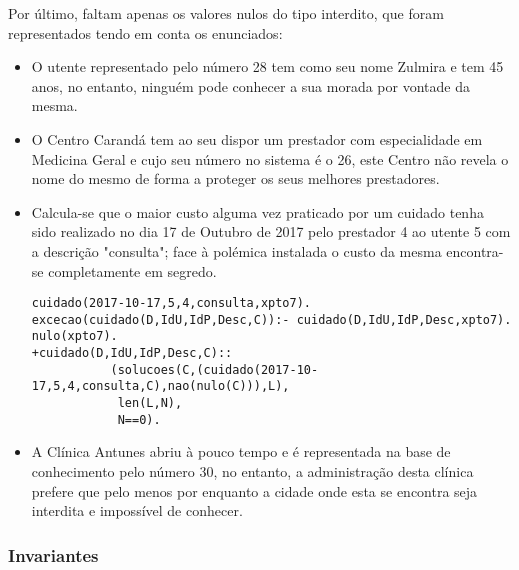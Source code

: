 \documentclass{article}
\begin{document}
Por último, faltam apenas os valores nulos do tipo interdito, que foram representados tendo em conta os enunciados:
\begin{itemize}
	\item O utente representado pelo número 28 tem como seu nome Zulmira e tem 45 anos, no entanto, ninguém pode conhecer a sua morada por vontade da mesma.
	\item O Centro Carandá tem ao seu dispor um prestador com especialidade em Medicina Geral e cujo seu número no sistema é o 26, este Centro não revela o nome do mesmo de forma a proteger os seus melhores prestadores.
    \item Calcula-se que o maior custo alguma vez praticado por um cuidado tenha sido realizado no dia 17 de Outubro de 2017 pelo prestador 4 ao utente 5 com a descrição "consulta"; face à polémica instalada o custo da mesma encontra-se completamente em segredo.
\begin{verbatim}
cuidado(2017-10-17,5,4,consulta,xpto7).
excecao(cuidado(D,IdU,IdP,Desc,C)):- cuidado(D,IdU,IdP,Desc,xpto7).
nulo(xpto7).
+cuidado(D,IdU,IdP,Desc,C)::
           (solucoes(C,(cuidado(2017-10-17,5,4,consulta,C),nao(nulo(C))),L),
            len(L,N),
            N==0).
\end{verbatim}
    \item A Clínica Antunes abriu à pouco tempo e é representada na base de conhecimento pelo número 30, no entanto, a administração desta clínica prefere que pelo menos por enquanto a cidade onde esta se encontra seja interdita e impossível de conhecer.
\end{itemize}

\subsubsection{Invariantes}
\end{document}
